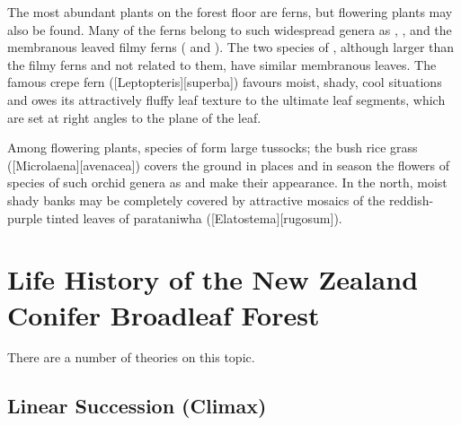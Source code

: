 The most abundant plants on the forest floor are ferns, but flowering plants may also be found.
Many of the ferns belong to such widespread genera as , ,  and the membranous leaved filmy ferns ( and ).
The two species of , although larger than the filmy ferns and not related to them, have similar membranous leaves.
The famous crepe fern ([Leptopteris][superba]) favours moist, shady, cool situations and owes its attractively fluffy leaf texture to the ultimate leaf segments, which are set at right angles to the plane of the leaf.

Among flowering plants, species of  form large tussocks; the bush rice grass ([Microlaena][avenacea]) covers the ground in places and in season the flowers of species of such orchid genera as  and  make their appearance.
In the north, moist shady banks may be completely covered by attractive mosaics of the reddish-purple tinted leaves of parataniwha ([Elatostema][rugosum]).

\section{Life History of the New Zealand Conifer Broadleaf Forest}

There are a number of theories on this topic.

\subsection[Linear Succession (Climax)]{Linear Succession (Climax)}


